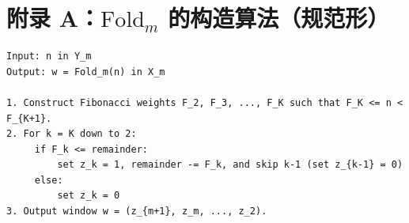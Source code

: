 \section{附录 A：\texorpdfstring{$\mathrm{Fold}_m$}{Fold\_m} 的构造算法（规范形）}

\begin{verbatim}
Input: n in Y_m
Output: w = Fold_m(n) in X_m

1. Construct Fibonacci weights F_2, F_3, ..., F_K such that F_K <= n < F_{K+1}.
2. For k = K down to 2:
     if F_k <= remainder:
         set z_k = 1, remainder -= F_k, and skip k-1 (set z_{k-1} = 0)
     else:
         set z_k = 0
3. Output window w = (z_{m+1}, z_m, ..., z_2).
\end{verbatim}

